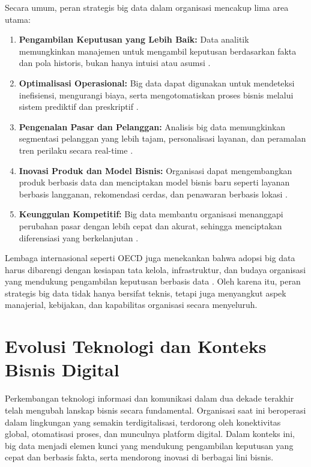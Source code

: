 Secara umum, peran strategis big data dalam organisasi mencakup lima area utama:

\begin{enumerate}
	\item \textbf{Pengambilan Keputusan yang Lebih Baik:} Data analitik memungkinkan manajemen untuk mengambil keputusan berdasarkan fakta dan pola historis, bukan hanya intuisi atau asumsi \cite{chen2012}.
	
	\item \textbf{Optimalisasi Operasional:} Big data dapat digunakan untuk mendeteksi inefisiensi, mengurangi biaya, serta mengotomatiskan proses bisnis melalui sistem prediktif dan preskriptif \cite{waller2013}.
	
	\item \textbf{Pengenalan Pasar dan Pelanggan:} Analisis big data memungkinkan segmentasi pelanggan yang lebih tajam, personalisasi layanan, dan peramalan tren perilaku secara real-time \cite{jeble2018}.
	
	\item \textbf{Inovasi Produk dan Model Bisnis:} Organisasi dapat mengembangkan produk berbasis data dan menciptakan model bisnis baru seperti layanan berbasis langganan, rekomendasi cerdas, dan penawaran berbasis lokasi \cite{mariani2021}.
	
	\item \textbf{Keunggulan Kompetitif:} Big data membantu organisasi menanggapi perubahan pasar dengan lebih cepat dan akurat, sehingga menciptakan diferensiasi yang berkelanjutan \cite{georgescu2020}.
\end{enumerate}

Lembaga internasional seperti OECD juga menekankan bahwa adopsi big data harus dibarengi dengan kesiapan tata kelola, infrastruktur, dan budaya organisasi yang mendukung pengambilan keputusan berbasis data \cite{oecd2015}. Oleh karena itu, peran strategis big data tidak hanya bersifat teknis, tetapi juga menyangkut aspek manajerial, kebijakan, dan kapabilitas organisasi secara menyeluruh.


\section{Evolusi Teknologi dan Konteks Bisnis Digital}

Perkembangan teknologi informasi dan komunikasi dalam dua dekade terakhir telah mengubah lanskap bisnis secara fundamental. Organisasi saat ini beroperasi dalam lingkungan yang semakin terdigitalisasi, terdorong oleh konektivitas global, otomatisasi proses, dan munculnya platform digital. Dalam konteks ini, big data menjadi elemen kunci yang mendukung pengambilan keputusan yang cepat dan berbasis fakta, serta mendorong inovasi di berbagai lini bisnis.

